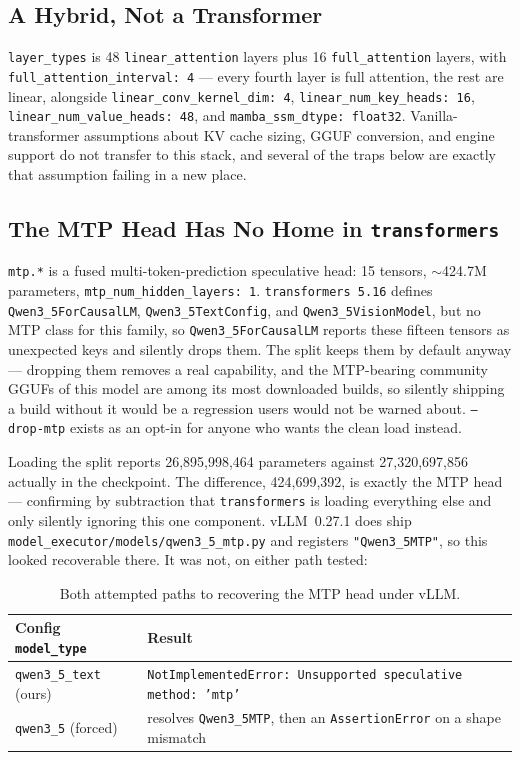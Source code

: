 \documentclass[11pt]{article}
\begin{document}
\subsection{A Hybrid, Not a Transformer}

\texttt{layer\_types} is 48 \texttt{linear\_attention} layers plus 16
\texttt{full\_attention} layers, with \texttt{full\_attention\_interval: 4} --- every
fourth layer is full attention, the rest are linear, alongside
\texttt{linear\_conv\_kernel\_dim: 4}, \texttt{linear\_num\_key\_heads: 16},
\texttt{linear\_num\_value\_heads: 48}, and \texttt{mamba\_ssm\_dtype: float32}. Vanilla-
transformer assumptions about KV cache sizing, GGUF conversion, and engine support do
not transfer to this stack, and several of the traps below are exactly that assumption
failing in a new place.

\subsection{The MTP Head Has No Home in \texttt{transformers}}

\texttt{mtp.*} is a fused multi-token-prediction speculative head: 15 tensors,
$\sim$424.7M parameters, \texttt{mtp\_num\_hidden\_layers: 1}. \texttt{transformers~5.16}
defines \texttt{Qwen3\_5ForCausalLM}, \texttt{Qwen3\_5TextConfig}, and
\texttt{Qwen3\_5VisionModel}, but no MTP class for this family, so
\texttt{Qwen3\_5ForCausalLM} reports these fifteen tensors as unexpected keys and
silently drops them. The split keeps them by default anyway --- dropping them removes a
real capability, and the MTP-bearing community GGUFs of this model are among its most
downloaded builds, so silently shipping a build without it would be a regression users
would not be warned about. \texttt{--drop-mtp} exists as an opt-in for anyone who wants
the clean load instead.

Loading the split reports 26,895,998,464 parameters against 27,320,697,856 actually in
the checkpoint. The difference, 424,699,392, is exactly the MTP head --- confirming by
subtraction that \texttt{transformers} is loading everything else and only silently
ignoring this one component. vLLM~0.27.1 does ship
\texttt{model\_executor/models/qwen3\_5\_mtp.py} and registers \texttt{"Qwen3\_5MTP"}, so
this looked recoverable there. It was not, on either path tested:

\begin{table}[h]
\centering
\small
\begin{tabular}{ll}
\toprule
Config \texttt{model\_type} & Result \\
\midrule
\texttt{qwen3\_5\_text} (ours) & \texttt{NotImplementedError: Unsupported speculative method: 'mtp'} \\
\texttt{qwen3\_5} (forced) & resolves \texttt{Qwen3\_5MTP}, then an \texttt{AssertionError} on a shape mismatch \\
\bottomrule
\end{tabular}
\caption{Both attempted paths to recovering the MTP head under vLLM.}
\end{table}
\end{document}
